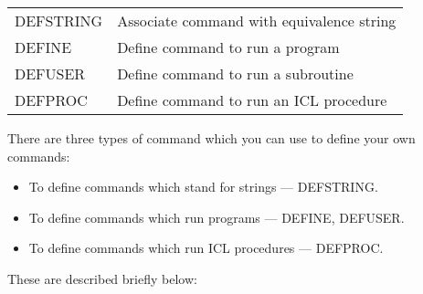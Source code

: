 \begin{center}
\begin{tabular}{|l|l|}
\hline
DEFSTRING & Associate command with equivalence string \\
DEFINE    & Define command to run a program \\
DEFUSER   & Define command to run a subroutine \\
DEFPROC   & Define command to run an ICL procedure \\
\hline
\end{tabular}
\end{center}

There are three types of command which you can use to define your own commands:
\begin{itemize}
\item To define commands which stand for strings --- DEFSTRING.
\item To define commands which run programs --- DEFINE, DEFUSER.
\item To define commands which run ICL procedures --- DEFPROC.
\end{itemize}
These are described briefly below:
